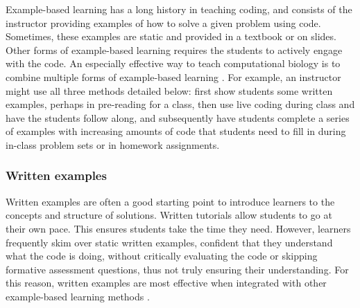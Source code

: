 Example-based learning has a long history in teaching coding, and consists of the instructor providing examples of how to solve a given problem using code.
Sometimes, these examples are static and provided in a textbook or on slides. 
Other forms of example-based learning requires the students to actively engage with the code. 
An especially effective way to teach computational biology is to combine multiple forms of example-based learning \citep{renkl_learning_2014}.
For example, an instructor might use all three methods detailed below:
first show students some written examples, perhaps in pre-reading for a class, then use live coding during class and have the students follow along, and subsequently have students complete a series of examples with increasing amounts of code that students need to fill in during in-class problem sets or in homework assignments.



\subsubsection{Written examples}

Written examples are often a good starting point to introduce learners to the concepts and structure of solutions.
Written tutorials allow students to go at their own pace.
This ensures students take the time they need.
However, learners frequently skim over static written examples, confident that they understand what the code is doing, without critically evaluating the code or skipping formative assessment questions, thus not truly ensuring their understanding.
For this reason, written examples are most effective when integrated with other example-based learning methods \citep{renkl_learning_2014}.


